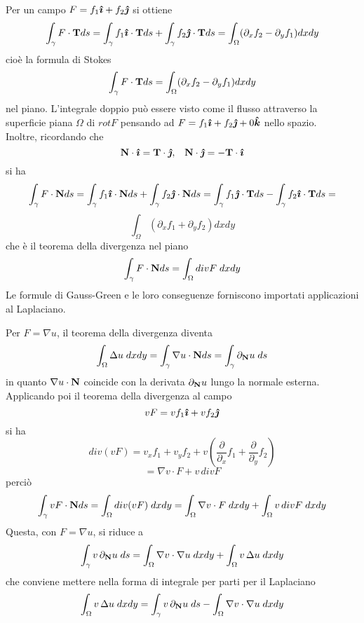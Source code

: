 Per un campo $F= f_1 \boldsymbol{\hat{\imath}} + f_2 \boldsymbol{\hat{\jmath}}$ si ottiene
\[
	\int_{\gamma} F \cdot {\bf T} ds
	= \int_{\gamma} f_1 \boldsymbol{\hat{\imath}} \cdot {\bf T} ds
	+ \int_{\gamma} f_2 \boldsymbol{\hat{\jmath}} \cdot {\bf T} ds
	= \int_{\Omega} (\partial_x f_2 - \partial_y f_1)dxdy
\]
cio\`e la formula di Stokes
\[
	\int_{\gamma} F \cdot {\bf T} ds
	= \int_{\Omega} (\partial_x f_2 - \partial_y f_1)dxdy
\]
nel piano. L'integrale doppio pu\`o essere visto come il flusso attraverso la
superficie piana $\Omega$ di $rot F$ pensando ad $F= f_1 \boldsymbol{\hat{\imath}} + f_2 \boldsymbol{\hat{\jmath}} +0\boldsymbol{\hat{k}}$ nello spazio.\\
Inoltre, ricordando che
\[
	{\bf N} \cdot \boldsymbol{\hat{\imath}}= {\bf T} \cdot \boldsymbol{\hat{\jmath}}, \;\;\;
	{\bf N} \cdot \boldsymbol{\hat{\jmath}}= -{\bf T} \cdot \boldsymbol{\hat{\imath}}
\]
si ha
\[
	\int_{\gamma} F \cdot {\bf N} ds=
	\int_{\gamma} f_1 \boldsymbol{\hat{\imath}} \cdot {\bf N} ds +
	\int_{\gamma} f_2 \boldsymbol{\hat{\jmath}} \cdot {\bf N} ds =
	\int_{\gamma} f_1 \boldsymbol{\hat{\jmath}} \cdot {\bf T} ds -
	\int_{\gamma} f_2 \boldsymbol{\hat{\imath}} \cdot {\bf T} ds =
\]
\[
	\int_{\Omega} \left( \partial_x f_1 + \partial_y f_2 \right)dxdy
\]
che \`e il teorema della divergenza nel piano
\[
	\int_{\gamma} F \cdot {\bf N} ds=
	\int_{\Omega} div F \; dxdy
\]
Le formule di Gauss-Green e le loro conseguenze forniscono importati applicazioni
al Laplaciano.

Per $F= \nabla u$, il teorema della divergenza diventa
\[
	\int_{\Omega} \Delta u \; dxdy=
	\int_{\gamma} \nabla u \cdot {\bf N} ds =
	\int_{\gamma} \partial_{\bf N} u \; ds
\]
in quanto $\nabla u \cdot {\bf N}$ coincide con la derivata
$ \partial_{\bf N} u$ lungo la normale esterna.\\
Applicando poi il teorema della divergenza al campo
\[
	vF= vf_1 \boldsymbol{\hat{\imath}} + vf_2 \boldsymbol{\hat{\jmath}}
\]
si ha
\[
	div(vF)= v_x f_1 + v_y f_2 + 
	v \left( \frac{\partial}{\partial_x} f_1 
	+ \frac{\partial}{\partial_y} f_2 \right)
\]
\[
	= \nabla v \cdot F + v\, divF
\]
perci\`o
\[
	\int_{\gamma} vF \cdot {\bf N} ds =
	\int_{\Omega} div(vF) \; dxdy=
	\int_{\Omega} \nabla v \cdot F \; dxdy +
	\int_{\Omega} v\, divF \; dxdy
\]
Questa, con $F= \nabla u$, si riduce a
\[
	\int_{\gamma} v \, \partial_{\bf N} u \; ds =
	\int_{\Omega} \nabla v \cdot \nabla u \; dxdy +
	\int_{\Omega} v\, \Delta u \; dxdy
\]
che conviene mettere nella forma di integrale per parti per il Laplaciano
\[
	\int_{\Omega} v\, \Delta u \; dxdy =
	\int_{\gamma} v \, \partial_{\bf N} u \; ds -
	\int_{\Omega} \nabla v \cdot \nabla u \; dxdy
\]
